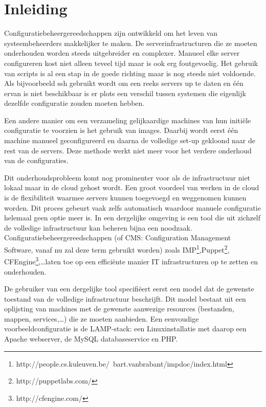 \chapter{Inleiding}
\label{inleiding}
Configuratiebeheergereedschappen zijn ontwikkeld om het leven van systeembeheerders makkelijker te maken.
De serverinfrastructuren die ze moeten onderhouden worden steeds uitgebreider en complexer.
Manueel elke server configureren kost niet alleen teveel tijd maar is ook erg foutgevoelig.
Het gebruik van scripts is al een stap in de goede richting maar is nog steeds niet voldoende.
Als bijvoorbeeld ssh gebruikt wordt om een reeks servers up te daten en \'e\'en ervan is niet beschikbaar is er plots een verschil tussen systemen die eigenlijk dezelfde configuratie zouden moeten hebben. 

Een andere manier om een verzameling gelijkaardige machines van hun initi\"ele configuratie te voorzien is het gebruik van images.
Daarbij wordt eerst \'e\'en machine manueel geconfigureerd en daarna de volledige set-up gekloond naar de rest van de servers.
Deze methode werkt niet meer voor het verdere onderhoud van de configuraties.

Dit onderhoudsprobleem komt nog prominenter voor als de infrastructuur niet lokaal maar in de cloud gehost wordt.
Een groot voordeel van werken in de cloud is de flexibiliteit waarmee servers kunnen toegevoegd en weggenomen kunnen worden.
Dit proces gebeurt vaak zelfs automatisch waardoor manuele configuratie helemaal geen optie meer is. 
In een dergelijke omgeving is een tool die uit zichzelf de volledige infrastructuur kan beheren bijna een noodzaak.
Configuratiebeheergereedschappen (of CMS: Configuration Management Software, vanaf nu zal deze term gebruikt worden) zoals
IMP\footnote{http://people.cs.kuleuven.be/~bart.vanbrabant/impdoc/index.html},Puppet\footnote{http://puppetlabs.com/}, CFEngine\footnote{http://cfengine.com/},\ldots laten toe op een effici\"ente manier IT infrastructuren op te zetten en onderhouden.

De gebruiker van een dergelijke tool specifi\"eert eerst een model dat de gewenste toestand van de volledige infrastructuur beschrijft.
Dit model bestaat uit een oplijsting van machines met de gewenste aanwezige resources (bestanden, mappen, services,\ldots) die ze moeten aanbieden.
Een eenvoudige voorbeeldconfiguratie is de LAMP-stack: een Linuxinstallatie met daarop een Apache webserver, de MySQL databaseservice en PHP.

